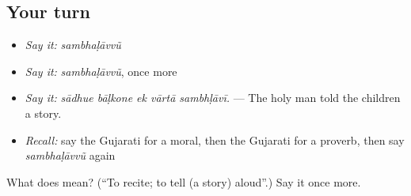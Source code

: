 \subsection*{Your turn}
\begin{itemize}
\raggedright
  \item \emph{Say it:} \emph{sambhaḷāvvũ}
  \item \emph{Say it:} \emph{sambhaḷāvvũ}, once more
  \item \emph{Say it:} \emph{sādhue bāḷkone ek vārtā sambhḷāvī.} — The holy man told the children a story.
  \item \emph{Recall:} say the Gujarati for a moral, then the Gujarati for a proverb, then say \emph{sambhaḷāvvũ} again
\end{itemize}

\begin{tcolorbox}[breakable,colback=teal!4,colframe=teal!35!black,title={Before you move on}]
What does  mean? (\textquotedblleft{}To recite; to tell (a story) aloud\textquotedblright{}.) Say it once more.
\end{tcolorbox}
